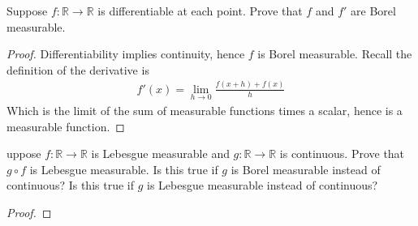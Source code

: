 \documentclass[10pt]{article}
\newcommand{\R}{\mathbb{R}}
\newenvironment{problem}[2][Problem]{\begin{trivlist}
		\item[\hskip \labelsep {\bfseries #1}\hskip \labelsep {\bfseries #2.}]}{\end{trivlist}}
\begin{document}
	\begin{problem}{7}
		Suppose $f : \R \rightarrow \R$ is differentiable at each point. Prove that $f$ and $f'$ are Borel measurable.
		\begin{proof}
			Differentiability implies continuity, hence $f$ is Borel measurable. Recall the definition of the derivative is 
			\begin{align*}
				f'(x) = \lim_{h\rightarrow 0} \frac{f(x+h) + f(x)}{h}
			\end{align*}
			Which is the limit of the sum of measurable functions times a scalar, hence is a measurable function.
		\end{proof}
	\end{problem}
	
	\begin{problem}
		Suppose $f : \R \rightarrow \R$ is Lebesgue measurable and $g : \R \rightarrow \R$ is continuous. Prove that $g \circ f$ is Lebesgue measurable. Is this true if $g$ is Borel measurable instead of continuous? Is this true if $g$ is Lebesgue measurable instead of continuous?
		\begin{proof}
			
		\end{proof}
	\end{problem}
\end{document}

